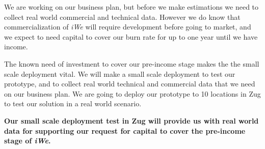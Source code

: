 We are working on our business plan, but before we make estimations we need to
collect real world commercial and technical data. However we do know that
commercialization of \textit{iWe} will require development before going to
market, and we expect to need capital to cover our burn rate for up to one year
until we have income.

The known need of investment to cover our pre-income stage makes the the small
scale deployment vital. We will make a small scale deployment to test our
prototype, and to collect real world technical and commercial data that we need
on our business plan.  We are going to deploy our prototype to 10 locations in
Zug to test our solution in a real world scenario.

\textbf{Our small scale deployment test in Zug will provide us with real world
data for supporting our request for capital to cover the pre-income stage of
\textit{iWe}.}
